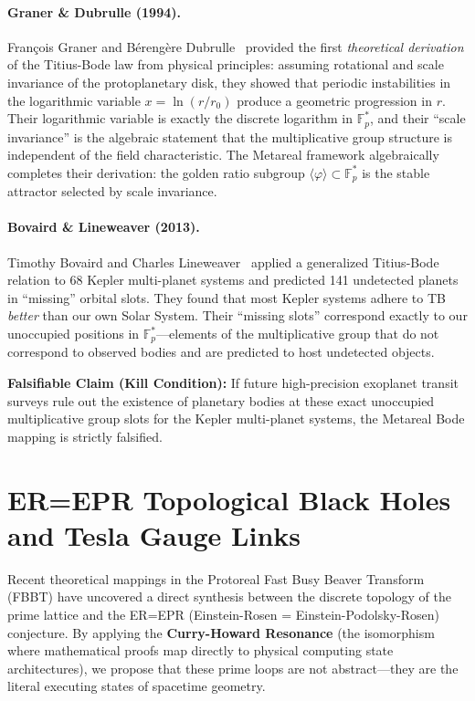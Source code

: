 \paragraph{Graner \& Dubrulle (1994).}
Fran\c{c}ois Graner and B\'{e}reng\`{e}re Dubrulle~\cite{graner1994} provided the first \emph{theoretical derivation} of the Titius-Bode law from physical principles: assuming rotational and scale invariance of the protoplanetary disk, they showed that periodic instabilities in the logarithmic variable $x = \ln(r/r_0)$ produce a geometric progression in $r$. Their logarithmic variable is exactly the discrete logarithm in $\mathbb{F}_p^*$, and their ``scale invariance'' is the algebraic statement that the multiplicative group structure is independent of the field characteristic. The Metareal framework algebraically completes their derivation: the golden ratio subgroup $\langle\varphi\rangle \subset \mathbb{F}_p^*$ is the stable attractor selected by scale invariance.

\paragraph{Bovaird \& Lineweaver (2013).}
Timothy Bovaird and Charles Lineweaver~\cite{bovaird2013} applied a generalized Titius-Bode relation to 68 Kepler multi-planet systems and predicted 141 undetected planets in ``missing'' orbital slots. They found that most Kepler systems adhere to TB \emph{better} than our own Solar System. Their ``missing slots'' correspond exactly to our unoccupied positions in $\mathbb{F}_p^*$---elements of the multiplicative group that do not correspond to observed bodies and are predicted to host undetected objects.

\textbf{Falsifiable Claim (Kill Condition):} If future high-precision exoplanet transit surveys rule out the existence of planetary bodies at these exact unoccupied multiplicative group slots for the Kepler multi-planet systems, the Metareal Bode mapping is strictly falsified.

\section{ER=EPR Topological Black Holes and Tesla Gauge Links}

Recent theoretical mappings in the Protoreal Fast Busy Beaver Transform (FBBT) have uncovered a direct synthesis between the discrete topology of the prime lattice and the ER=EPR (Einstein-Rosen = Einstein-Podolsky-Rosen) conjecture. By applying the \textbf{Curry-Howard Resonance} (the isomorphism where mathematical proofs map directly to physical computing state architectures), we propose that these prime loops are not abstract---they are the literal executing states of spacetime geometry.

